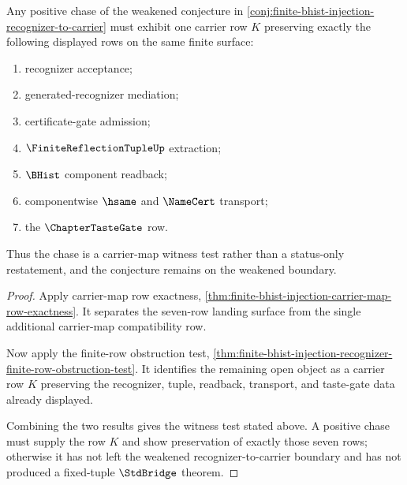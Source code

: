 \begin{theorem}
\label{thm:finite-bhist-injection-carrier-map-row-witness-test}
Any positive chase of the weakened conjecture in \autoref{conj:finite-bhist-injection-recognizer-to-carrier} must exhibit one carrier row $K$ preserving exactly the following displayed rows on the same finite surface:
\begin{enumerate}
\item recognizer acceptance;
\item generated-recognizer mediation;
\item certificate-gate admission;
\item $\FiniteReflectionTupleUp$ extraction;
\item $\BHist$ component readback;
\item componentwise $\hsame$ and $\NameCert$ transport;
\item the $\ChapterTasteGate$ row.
\end{enumerate}
Thus the chase is a carrier-map witness test rather than a status-only restatement, and the conjecture remains on the weakened boundary.
\end{theorem}
\begin{proof}
Apply carrier-map row exactness, \autoref{thm:finite-bhist-injection-carrier-map-row-exactness}. It separates the seven-row landing surface from the single additional carrier-map compatibility row.

Now apply the finite-row obstruction test, \autoref{thm:finite-bhist-injection-recognizer-finite-row-obstruction-test}. It identifies the remaining open object as a carrier row $K$ preserving the recognizer, tuple, readback, transport, and taste-gate data already displayed.

Combining the two results gives the witness test stated above. A positive chase must supply the row $K$ and show preservation of exactly those seven rows; otherwise it has not left the weakened recognizer-to-carrier boundary and has not produced a fixed-tuple $\StdBridge$ theorem.
\end{proof}

